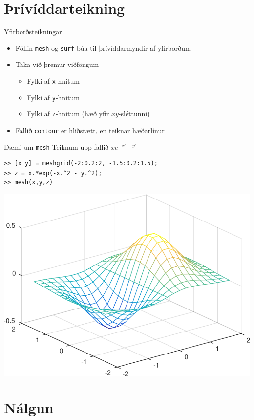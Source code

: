 \documentclass{beamer}
\begin{document}
\section{Þrívíddarteikning}

\begin{frame}{Yfirborðsteikningar}
    \begin{itemize}
        \item Föllin \texttt{mesh} og \texttt{surf} búa til þrívíddarmyndir af yfirborðum
        \item Taka við þremur viðföngum
        \begin{itemize}
            \item Fylki af \texttt{x}-hnitum
            \item Fylki af \texttt{y}-hnitum
            \item Fylki af \texttt{z}-hnitum (hæð yfir $xy$-sléttunni)
        \end{itemize}
        \item Fallið \texttt{contour} er hliðstætt, en teiknar hæðarlínur
    \end{itemize}
\end{frame}
    
\begin{frame}[fragile]{Dæmi um \texttt{mesh}}
    \vspace{1cm}
    Teiknum upp fallið $xe^{-x^2-y^2}$

\begin{verbatim}
>> [x y] = meshgrid(-2:0.2:2, -1.5:0.2:1.5);
>> z = x.*exp(-x.^2 - y.^2);
>> mesh(x,y,z)
\end{verbatim}
    
    \begin{center}
    \includegraphics[width=0.4\linewidth]{../T1a/Pics/3dmesh}
    \end{center}
\end{frame}

\section{Nálgun}
\end{document}
